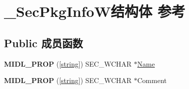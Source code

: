 \hypertarget{struct___sec_pkg_info_w}{}\section{\+\_\+\+Sec\+Pkg\+Info\+W结构体 参考}
\label{struct___sec_pkg_info_w}
\subsection*{Public 成员函数}
\begin{DoxyCompactItemize}
\item 
\mbox{\label{struct___sec_pkg_info_w_a23ad249e880255124857b85938e38c3e}} 
{\bfseries M\+I\+D\+L\+\_\+\+P\+R\+OP} (\mbox{[}\hyperlink{structstring}{string}\mbox{]}) S\+E\+C\+\_\+\+W\+C\+H\+AR $\ast$\hyperlink{struct_name_rec__}{Name}
\item 
\mbox{\label{struct___sec_pkg_info_w_ac0088032c7b365eaf9d070eb1270b3a0}} 
{\bfseries M\+I\+D\+L\+\_\+\+P\+R\+OP} (\mbox{[}\hyperlink{structstring}{string}\mbox{]}) S\+E\+C\+\_\+\+W\+C\+H\+AR $\ast$Comment
\end{DoxyCompactItemize}
